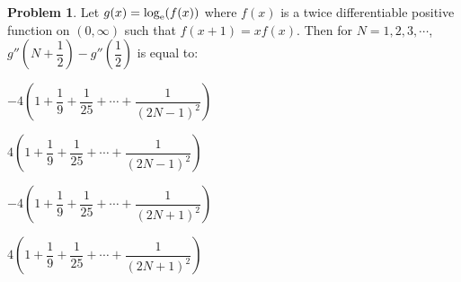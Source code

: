 \documentclass[14]{article}
\theoremstyle{definition}
\newtheorem{prob}{Problem}
\begin{document}
\begin{prob}
Let $g(x) = \log_{\rm e}(f(x))$ where $f(x)$ is a twice differentiable positive function on $(0, \infty)$ such that $f(x + 1) = x f(x)$. Then for $N = 1, 2, 3, \cdots$, $g''\left(N + \dfrac12\right) - g''\left(\dfrac12\right)$ is equal to:\\
\begin{enumerate*}[label=(\Alph*)]
\item $-4 \left(1 + \dfrac19 + \dfrac{1}{25} + \cdots + \dfrac{1}{(2N-1)^2} \right)$\;\;
\item $4 \left(1 + \dfrac19 + \dfrac{1}{25} + \cdots + \dfrac{1}{(2N-1)^2} \right)$\\
\item $-4 \left(1 + \dfrac19 + \dfrac{1}{25} + \cdots + \dfrac{1}{(2N+1)^2} \right)$\;\;
\item $4 \left(1 + \dfrac19 + \dfrac{1}{25} + \cdots + \dfrac{1}{(2N+1)^2} \right)$
\end{enumerate*}

\end{prob}
\end{document}
